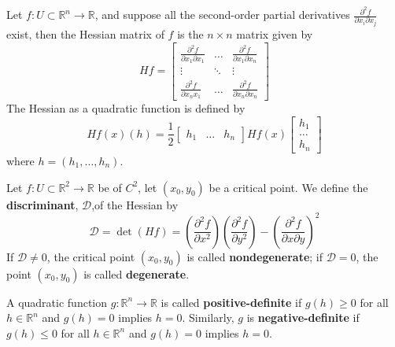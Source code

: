 \documentclass[openany]{book}
\newcommand{\R}{\mathbb{R}}
\begin{document}
\begin{defn}
    Let $f:U\subset\R^n\to\R$, and suppose all the second-order partial derivatives $\frac{\partial^2 f}{\partial x_i\partial x_j}$ exist, then the Hessian matrix of $f$ is the $n\times n$ matrix given by 
    \begin{equation*}
        Hf=\begin{bmatrix}
            \frac{\partial^2 f}{\partial x_1\partial x_1}&\dots&\frac{\partial^2f}{\partial x_1\partial x_n}\\
            \vdots&\ddots&\vdots\\
            \frac{\partial^2f}{\partial x_nx_1}&\dots&\frac{\partial^2f}{\partial x_n\partial x_n}
        \end{bmatrix}
    \end{equation*}
    The Hessian as a quadratic function is defined by 
    \begin{equation*}
        Hf(x)(h)=\frac{1}{2}\begin{bmatrix}
            h_1&\dots&h_n
        \end{bmatrix}Hf(x)\begin{bmatrix}
            h_1\\
            \dots\\
            h_n
        \end{bmatrix}
    \end{equation*}
    where $h=(h_1,\dots,h_n)$.
\end{defn}

\begin{defn}
    Let $f:U\subset\R^2\to\R$ be of $C^2$, let $(x_0,y_0)$ be a critical point. We define the \textbf{discriminant}, \boldmath $\mathcal{D}$,\unboldmath of the Hessian by
    \begin{equation*}
        \mathcal{D}=\det (Hf)=\left(\frac{\partial^2f}{\partial x^2}\right)\left(\frac{\partial^2f}{\partial y^2}\right)-\left(\frac{\partial^2f}{\partial x\partial y}\right)^2
    \end{equation*}
    If $\mathcal{D}\neq 0$, the critical point $(x_0,y_0)$ is called \textbf{nondegenerate}; if $\mathcal{D}=0$, the point $(x_0,y_0)$ is called \textbf{degenerate}.
\end{defn}

\begin{defn}
    A quadratic function $g:\R^n\to\R$ is called \textbf{positive-definite} if $g(h)\geq 0$ for all $h\in\R^n$ and $g(h)=0$ implies $h=0$. Similarly, $g$ is \textbf{negative-definite} if $g(h)\leq 0$ for all $h\in\R^n$ and $g(h)=0$ implies $h=0$. 
\end{defn}
\end{document}
